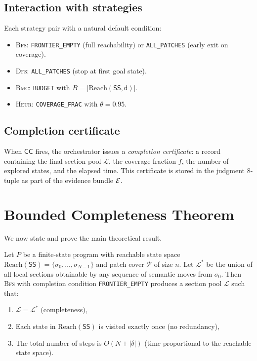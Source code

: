 \documentclass[11pt]{article}
\newcommand{\state}{\sigma}                   %
\newcommand{\Trans}{\delta}                   %
\newcommand{\reach}{\mathrm{Reach}}           %
\newcommand{\BFS}{\textsc{Bfs}}
\newcommand{\DFS}{\textsc{Dfs}}
\newcommand{\BMC}{\textsc{Bmc}}
\newcommand{\HEUR}{\textsc{Heur}}
\newcommand{\depth}{\mathsf{d}}               %
\newcommand{\CCond}{\mathsf{CC}}              %
\newcommand{\patchset}{\mathcal{P}}           %
\newcommand{\budg}{B}                         %
\newcommand{\covfrac}{f}                      %
\begin{document}
\subsection{Interaction with strategies}

Each strategy pair with a natural default condition:

\begin{itemize}
  \item \BFS{}: \texttt{FRONTIER\_EMPTY} (full reachability) or
    \texttt{ALL\_PATCHES} (early exit on coverage).
  \item \DFS{}: \texttt{ALL\_PATCHES} (stop at first goal state).
  \item \BMC{}: \texttt{BUDGET} with $\budg = |\reach(\mathsf{SS}, \depth)|$.
  \item \HEUR{}: \texttt{COVERAGE\_FRAC} with $\theta = 0.95$.
\end{itemize}

\subsection{Completion certificate}

When $\CCond$ fires, the orchestrator issues a \emph{completion
certificate}: a record containing the final section pool $\mathcal{L}$,
the coverage fraction $\covfrac$, the number of explored states, and
the elapsed time.  This certificate is stored in the judgment 8-tuple
as part of the evidence bundle $\mathcal{E}$.

\section{Bounded Completeness Theorem}\label{sec:theorem}

We now state and prove the main theoretical result.

\begin{theorem}\label{thm:bounded-completeness}
Let $P$ be a finite-state program with reachable state space
$\reach(\mathsf{SS}) = \{\state_0, \dots, \state_{N-1}\}$ and patch
cover $\patchset$ of size $n$.  Let $\mathcal{L}^*$ be the union of
all local sections obtainable by any sequence of semantic moves from
$\state_0$.  Then \BFS{} with completion condition
\texttt{FRONTIER\_EMPTY} produces a section pool $\mathcal{L}$ such
that:
\begin{enumerate}[label=(\roman*)]
  \item $\mathcal{L} = \mathcal{L}^*$ \quad (completeness),
  \item Each state in $\reach(\mathsf{SS})$ is visited exactly once
    \quad (no redundancy),
  \item The total number of steps is $O(N + |\Trans|)$ \quad
    (time proportional to the reachable state space).
\end{enumerate}
\end{theorem}
\end{document}
